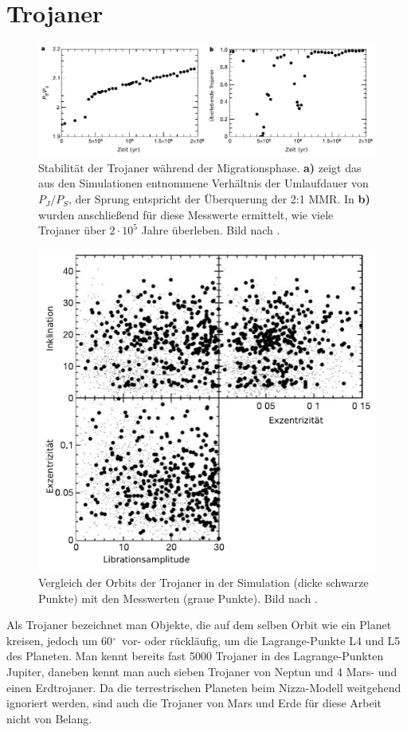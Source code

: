 \documentclass[12pt,a4paper,twoside]{article}
\renewcommand{\cite}{\citep}
\newcommand{\degree}{$^\circ$}
\begin{document}
\FloatBarrier
\section{Trojaner}\label{Trojaner}
\newcommand{\PJS}{P_J/P_S}

\begin{figure}
\centering 
\includegraphics[scale=1]{img/Morbidelli2005-1v}
\caption{Stabilität der Trojaner während der Migrationsphase. \textbf{a)} zeigt das aus den Simulationen entnommene Verhältnis der Umlaufdauer von $\PJS$, der Sprung entspricht der Überquerung der 2:1 MMR. In \textbf{b)} wurden anschließend für diese Messwerte ermittelt, wie viele Trojaner über $2\cdot10^5$ Jahre überleben. Bild nach \cite{Morbidelli2005}.}
\label{fig:Trojanerstabilitaet}
\end{figure}
\begin{figure}
\centering 
\includegraphics[scale=1]{img/Morbidelli2005-2}
\caption{Vergleich der Orbits der Trojaner in der Simulation (dicke schwarze Punkte) mit den Messwerten (graue Punkte). Bild nach \cite{Morbidelli2005}.}
\label{fig:Trojanerorbitale}
\end{figure}
Als Trojaner bezeichnet man Objekte, die auf dem selben Orbit wie ein Planet kreisen, jedoch um 60\degree\ vor- oder rückläufig, um die Lagrange-Punkte L4 und L5 des Planeten. 
Man kennt bereits fast 5000 Trojaner in des Lagrange-Punkten Jupiter, daneben kennt man auch sieben Trojaner von Neptun und 4 Mars- und einen Erdtrojaner. %
Da die terrestrischen Planeten beim Nizza-Modell weitgehend ignoriert werden, sind auch die Trojaner von Mars und Erde für diese Arbeit nicht von Belang.
\end{document}
